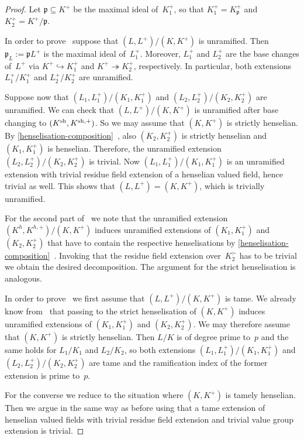 \documentclass[a4paper,twoside,11pt,reqno]{amsart}
\newcommand{\fp}{{\mathfrak p}}
\newcommand{\sh}{{\rm sh}}   %
\theoremstyle{definition}
\numberwithin{equation}{subsection}
\begin{document}
\begin{proof}
    Let $\fp \subseteq K^+$ be the maximal ideal of~$K_1^+$, so that $K_1^+ = K^+_\fp$ and $K_2^+ = K^+/\fp$.
    
    In order to prove~ suppose that $(L,L^+)/(K,K^+)$ is unramified.
    Then $\fp_L := \fp L^+$ is the maximal ideal of~$L_1^+$.
    Moreover, $L_1^+$ and $L_2^+$ are the base changes of~$L^+$ via $K^+ \hookrightarrow K_1^+$ and $K^+ \twoheadrightarrow K_2^+$, respectively.
    In particular, both extensions $L_1^+/K_1^+$ and $L_2^+/K_2^+$ are unramified.
    
    Suppose now that $(L_1,L_1^+)/(K_1,K_1^+)$ and $(L_2,L_2^+)/(K_2,K_2^+)$ are unramified.
    We can check that $(L,L^+)/(K,K^+)$ is unramified after base changing to $(K^\sh,K^{\sh,+})$.
    So we may assume that $(K,K^+)$ is strictly henselian.
    By \cref{henselisation-composition}~, also $(K_2,K_2^+)$ is strictly henselian and $(K_1,K_1^+)$ is henselian.
    Therefore, the unramified extension $(L_2,L_2^+)/(K_2,K_2^+)$ is trivial.
    Now $(L_1,L_1^+)/(K_1,K_1^+)$ is an unramified extension with trivial residue field extension of a henselian valued field, hence trivial as well.
    This shows that $(L,L^+) = (K,K^+)$, which is trivially unramified.

    For the second part of~ we note that the unramified extension $(K^h,K^{h,+})/(K,K^+)$ induces unramified extensions of $(K_1,K_1^+)$ and $(K_2,K_2^+)$ that have to contain the respective henselisations by \cref{henselisation-composition}~.
    Invoking that the residue field extension over~$K_2^\succ$ has to be trivial we obtain the desired decomposition.
    The argument for the strict henselisation is analogous.

    In order to prove~ we first assume that $(L,L^+)/(K,K^+)$ is tame.
    We already know from~ that passing to the strict henselisation of $(K,K^+)$ induces unramified extensions of $(K_1,K_1^+)$ and $(K_2,K_2^+)$.
    We may therefore assume that $(K,K^+)$ is strictly henselian.
    Then $L/K$ is of degree prime to~$p$ and the same holds for $L_1/K_1$ and $L_2/K_2$, so both extensions $(L_1,L_1^+)/(K_1,K_1^+)$ and $(L_2,L_2^+)/(K_2,K_2^+)$ are tame and the ramification index of the former extension is prime to~$p$.
    
    For the converse we reduce to the situation where $(K,K^+)$ is tamely henselian.
    Then we argue in the same way as before using that a tame extension of henselian valued fields with trivial residue field extension and trivial value group extension is trivial.
\end{proof}
\end{document}

